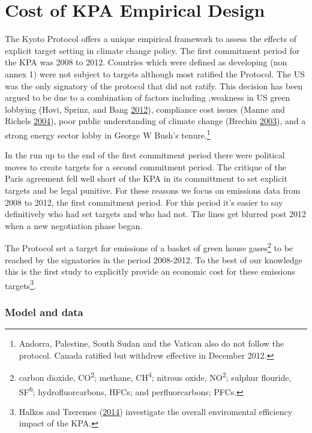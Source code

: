 \documentclass[
  12pt,
]{article}
\begin{document}
\hypertarget{cost-of-kpa-empirical-design}{%
\section{Cost of KPA Empirical Design}\label{cost-of-kpa-empirical-design}}

The Kyoto Protocol offers a unique empirical framework to assess the effects of explicit target setting in climate change policy. The first commitment period for the KPA was 2008 to 2012. Countries which were defined as developing (non annex 1) were not subject to targets although most ratified the Protocol. The US was the only signatory of the protocol that did not ratify. This decision has been argued to be due to a combination of factors including ,weakness in US green lobbying (Hovi, Sprinz, and Bang \protect\hyperlink{ref-Hovi2012}{2012}), compliance cost issues (Manne and Richels \protect\hyperlink{ref-Manne2004}{2004}), poor public understanding of climate change (Brechin \protect\hyperlink{ref-Brechin2003}{2003}), and a strong energy sector lobby in George W Bush's tenure.\footnote{Andorra, Palestine, South Sudan and the Vatican also do not follow the protocol. Canada ratified but withdrew effective in December 2012.}

In the run up to the end of the first commitment period there were political moves to create targets for a second commitment period. The critique of the Paris agreement fell well short of the KPA in its committment to set explicit targets and be legal punitive. For these reasons we focus on emissions data from 2008 to 2012, the first commitment period. For this period it's easier to say definitively who had set targets and who had not. The lines get blurred post 2012 when a new negotiation phase began.

The Protocol set a target for emissions of a basket of green house gases\footnote{carbon dioxide, CO\textsuperscript{2}; methane, CH\textsuperscript{4}; nitrous oxide, NO\textsuperscript{2}; sulphur flouride, SF\textsuperscript{6}; hydrofluorcarbons, HFCs; and perfluorcarbons; PFCs.} to be reached by the signatories in the period 2008-2012. To the best of our knowledge this is the first study to explicitly provide an economic cost for these emissions targets\footnote{Halkos and Tzeremes (\protect\hyperlink{ref-Halkos2014}{2014}) investigate the overall enviromental efficiency impact of the KPA.}.

\hypertarget{model-and-data}{%
\subsubsection{Model and data}\label{model-and-data}}
\end{document}
